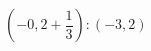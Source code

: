 \begin{ex}[type=calculate]
	\begin{condition}
		\( \left( -0,2+\dfrac{1}{3} \right):(-3,2) \)
	\end{condition}
	\answer{}
\end{ex}